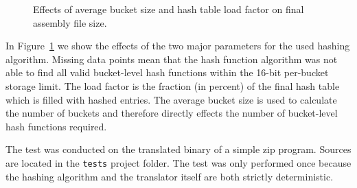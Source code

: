 \documentclass[course=eragp]{aspdoc}
\begin{document}
\begin{figure}
    \begin{centering}
        \caption{Effects of average bucket size and hash table load factor on final assembly file size.}\label{hashing_figure}
    \end{centering}
\end{figure}

In Figure~\ref{hashing_figure} we show the effects of the two major parameters for the used hashing
algorithm. Missing data points mean that the hash function algorithm was not able to find all valid
bucket-level hash functions within the 16-bit per-bucket storage limit. The load factor is the fraction (in percent) of the
final hash table which is filled with
hashed entries. The average bucket size is used to calculate the number of buckets and therefore
directly effects the number of bucket-level hash functions required.

\par

The test was conducted on the translated binary of a simple zip program. Sources are located in the
\texttt{tests} project folder. The test was only performed once because the hashing algorithm and
the translator itself are both strictly deterministic.
\end{document}
